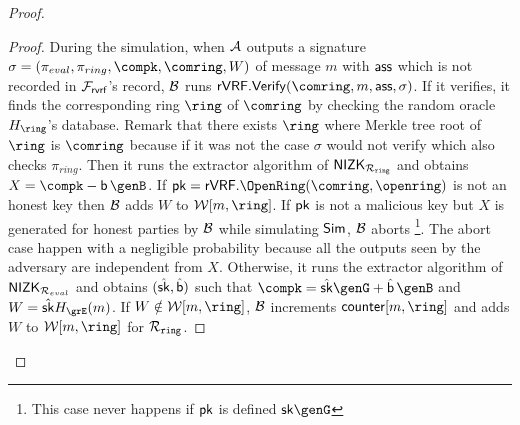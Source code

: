 \begin{proof}
\begin{proof}
%				
%						
%						
%						
%						
%						
%						
			
%				
%						
%						
%						
%						
%						
%						
%						
%						
%						

			
			During the simulation, when $ \mathcal{A} $ outputs a signature $ \sigma = (\pi_{eval},\pi_{ring},\compk,\comring,W) $ of message $ m $ with $ \mathsf{ass} $ which is not recorded in $ \mathcal{F}_{\textsf{rvrf}} $'s record, $ \mathcal{B} $ runs $ \rVRF.\Verify(\comring,m, \aux, \sigma) $. If it verifies, it finds the corresponding ring $ \ring $ of $ \comring $ by checking the random oracle $ \hash_\ring $'s database. Remark that there exists $ \ring $ where Merkle tree root of $ \ring $ is $ \comring $ because if it was not the case $ \sigma $ would not verify which also checks  $ \pi_{ring} $. 
			Then it runs the extractor algorithm of $ {\mathsf{NIZK}}_{\mathcal{R}_{\mathtt{ring}}} $ and obtains $ X = \compk  - \openpk \, \genB $. 
			If $ \pk = \rVRF.\OpenRing(\comring,\openring) $ is not an honest key then $\mathcal{B} $ adds $ W $  to $ \anonymouskeylist[m, \ring] $.  If $ \mathsf{pk} $ is not a malicious key but $ X $ is  generated for honest parties by $ \mathcal{B} $ while simulating $ \mathsf{Sim} $, $ \mathcal{B} $ aborts \footnote{This case never happens if $ \mathsf{pk}  $ is defined $ \sk\genG $}. The abort case happen with a negligible probability because all the outputs seen by the adversary are independent from $ X $.
			Otherwise, it  runs the extractor algorithm of $ {\mathsf{NIZK}}_{\mathcal{R}_{eval}} $ and obtains $(\hat{\mathsf{sk}},\hat{\mathsf{b}} )$ such that $ \compk = \hat{\sk}\genG + \hat{\openpk} \, \genB $ and $ W = \hat{\sk} \hashG(m) $. If  $ W \notin \anonymouskeylist[m, \ring] $, $ \mathcal{B} $ increments  $ \counter[m,\ring] $ and adds $ W $ to $ \anonymouskeylist[m,\ring] $ for $ \mathcal{R}_{\mathtt{ring}} $.


\end{proof}
\end{proof}
